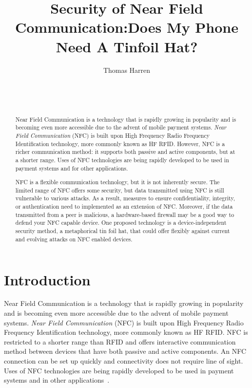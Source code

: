 \documentclass{sig-alternate}
\begin{document}

\title{Security of Near Field Communication:\break Does My Phone Need A Tinfoil Hat?}


\author{
\alignauthor
Thomas Harren\\
	\\
	\\
	\\
}

\maketitle
\begin{abstract}
Near Field Communication is a technology that is rapidly growing in popularity and is becoming even more accessible due to the advent of mobile payment systems. \textit{Near Field Communication} (NFC) is built upon High Frequency Radio Frequency Identification technology, more commonly known as HF RFID. However, NFC is a richer communication method: it supports both passive and active components, but at a shorter range. Uses of NFC technologies are being rapidly developed to be used in payment systems and for other applications. 

NFC is a flexible communication technology, but it is not inherently secure. The limited range of NFC offers some security, but data transmitted using NFC is still vulnerable to various attacks. As a result, measures to ensure confidentiality, integrity, or authentication need to implemented as an extension of NFC. Moreover, if the data transmitted from a peer is malicious, a hardware-based firewall may be a good way to defend your NFC capable device. One proposed technology is a device-independent security method, a metaphorical tin foil hat, that could offer flexibly against current and evolving attacks on NFC enabled devices.
\end{abstract}


\section{Introduction}
\label{sec:introduction}
Near Field Communication is a technology that is rapidly growing in popularity and is becoming even more accessible due to the advent of mobile payment systems. \textit{Near Field Communication} (NFC) is built upon High Frequency Radio Frequency Identification technology, more commonly known as HF RFID. NFC is restricted to a shorter range than RFID and offers interactive communication method between devices that have both passive and active components. An NFC connection can be set up quickly and connectivity does not require line of sight. Uses of NFC technologies are being rapidly developed to be used in payment systems and in other applications~\cite{Gum2013}. 
\end{document}
